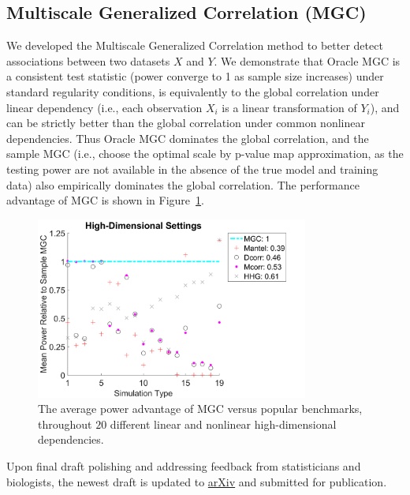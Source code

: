 \documentclass[simplex.tex]{subfiles}
\begin{document}
\subsection{Multiscale Generalized Correlation (MGC)}

We developed the Multiscale Generalized Correlation method to better detect associations between two datasets $X$ and $Y$. We demonstrate that Oracle MGC is a consistent test statistic (power converge to 1 as sample size increases) under standard regularity conditions, is equivalently to the global correlation under linear dependency (i.e., each observation $X_i$ is a linear transformation of $Y_i$), and can be strictly better than the global correlation under common nonlinear dependencies. Thus Oracle MGC dominates the global correlation, and the sample MGC (i.e., choose the optimal scale by p-value map approximation, as the testing power are not available in the absence of the true model and training data) also empirically dominates the global correlation. The performance advantage of MGC is shown in Figure~\ref{fig:mgcall}.
%
\begin{figure}[h!]
\begin{cframed}
		\centering
		\includegraphics[width=0.8\textwidth]{../../figs/FigHDPowerSummary}
    \caption{The average power advantage of MGC versus popular benchmarks, throughout $20$ different linear and nonlinear high-dimensional dependencies.}
		\label{fig:mgcall}
		\end{cframed}
\end{figure}

Upon final draft polishing and addressing feedback from statisticians and biologists, the newest draft is updated to \href{https://arxiv.org/pdf/1609.05148.pdf}{arXiv} and submitted for publication. 

\clearpage
\end{document}
